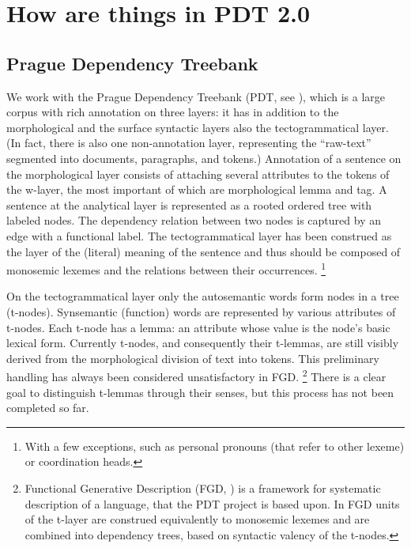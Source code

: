 
\chapter{How are things in PDT 2.0}\label{PDT}
\label{sec:pdt}
\section{Prague Dependency Treebank}
\label{sec:pdt:pdt}
We work with the Prague Dependency Treebank (PDT, see \citealp{hajic:2005}), which is a large corpus with rich annotation on three layers: it has in addition to the morphological and the surface syntactic layers also the tectogrammatical layer.
(In fact, there is also one non-annotation layer, representing the ``raw-text'' segmented into documents, paragraphs, and tokens.)
Annotation of a sentence on the morphological layer consists of attaching several attributes to the tokens of the w-layer, the most important of which are morphological lemma and tag.
A sentence at the analytical layer is represented as a rooted ordered tree with labeled nodes. The dependency relation between two nodes is captured by an edge with a functional label.
The tectogrammatical layer has been construed as the layer of the (literal) meaning of the sentence and thus should be composed of monosemic lexemes and the relations between their occurrences.%
\footnote{With a few exceptions, such as personal pronouns (that refer to other lexeme) or coordination heads.}

On the tectogrammatical layer only the autosemantic words form nodes in a tree (t-nodes). Synsemantic (function) words are represented by various attributes of t-nodes. Each t-node has a lemma: an attribute whose value is the node's basic lexical form.
Currently t-nodes, and consequently their t-lemmas, are still visibly derived from the morphological division of text into tokens. This preliminary handling has always been considered unsatisfactory in FGD.%
\footnote{Functional Generative Description (FGD, \citealp{sgall-etal:1986,hajicova:1998}) is a framework for systematic description of a language, that the PDT project is based upon. In FGD units of the t-layer are construed equivalently to monosemic lexemes and are combined into dependency trees, based on syntactic valency of the t-nodes.}
There is a clear goal to distinguish t-lemmas through their senses, but %
this process has not been completed so far.

